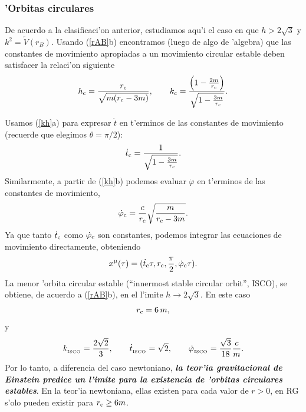 \subsubsection{'Orbitas circulares}
De acuerdo a la clasificaci'on anterior, estudiamos aqu'i el caso en que $h>2\sqrt{3}$ y $k^2=\tilde{V}(r_B)$. Usando (\ref{rAB}b) encontramos (luego de algo de 'algebra) que las constantes de movimiento apropiadas a un movimiento circular estable deben satisfacer la relaci'on siguiente
\begin{equation}
h_{\rm c}=\frac{r_{\rm c}}{\sqrt{m(r_{\rm c}-3m)}}, \qquad  k_{\rm c}=\frac{\left(1-\frac{2m}{r_{\rm c}}\right)}{\sqrt{1-\frac{3m}{r_{\rm c}}}}.
\end{equation}

Usamos (\ref{kh}a)  para expresar $\dot{t}$ en t'erminos de las constantes de movimiento (recuerde que elegimos $\theta=\pi/2$):
\begin{equation}
 \dot{t}_{\rm c}=\frac{1}{\sqrt{1-\frac{3m}{r_{\rm c}}}}.
\end{equation}
Similarmente, a partir de (\ref{kh}b) podemos evaluar $\dot\varphi$ en t'erminos de las constantes de movimiento,
\begin{equation}
 \dot\varphi_{\rm c}=\frac{c}{r_{\rm c}}\sqrt{\frac{m}{r_{\rm c}-3m}}.
\end{equation}
Ya que tanto $ \dot{t}_{\rm c}$ como $ \dot\varphi_{\rm c}$ son constantes, podemos integrar las ecuaciones de movimiento directamente, obteniendo
\begin{equation}
 x^\mu(\tau)=( \dot{t}_{\rm c}\tau,r_{\rm c},\frac{\pi}{2}, \dot\varphi_{\rm c}\tau).
\end{equation}
La menor 'orbita circular estable (``innermost stable circular orbit'', ISCO), se obtiene, de acuerdo a (\ref{rAB}b), en el l'imite $h\to 2\sqrt{3}$. En este caso
\begin{equation}
 r_{\rm c}=6\,m,
\end{equation}
y
\begin{equation}
 k_{_{\rm ISCO}}= \frac{2\sqrt{2}}{3}, \qquad \dot{t}_{_{\rm ISCO}}=\sqrt{2}, \qquad \dot\varphi_{_{\rm ISCO}}=\frac{\sqrt{3}}{18}\frac{c}{m}.
\end{equation}
Por lo tanto, a diferencia del caso newtoniano, \textbf{\textit{la teor'ia gravitacional de Einstein predice un l'imite para la existencia de 'orbitas circulares estables}}. En la teor'ia newtoniana, ellas existen para cada valor de $r>0$, en RG s'olo pueden existir para $r_{\rm c}\ge6m$.

